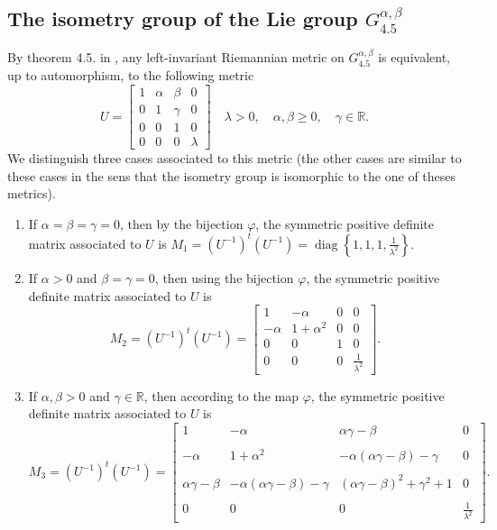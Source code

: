 \documentclass[12pt,a4paper,twoside]{article}
\theoremstyle{definition}
\begin{document}
\subsection{The isometry group of the Lie group $G_{4.5}^{\alpha, \beta}$}
By theorem 4.5. in \cite{aitbenhaddou2025classification}, any left-invariant Riemannian metric on $G_{4.5}^{\alpha, \beta}$ is equivalent, up to automorphism, to the following metric
$$U = \begin{bmatrix}
1 & \alpha & \beta & 0\\
0 & 1 & \gamma & 0\\
0 & 0 & 1 & 0\\
0 & 0 & 0 & \lambda
\end{bmatrix} \quad \lambda > 0, \quad \alpha, \beta \geq 0, \quad \gamma \in \mathbb{R}.$$
We distinguish three cases associated to this metric (the other cases are similar to these cases in the sens that the isometry group is isomorphic to the one of theses metrics).
\begin{enumerate}
\item If $\alpha = \beta = \gamma = 0$, then by the bijection $\varphi$, the symmetric positive definite matrix associated to $U$ is $M_1 = (U^{-1})^t(U^{-1}) = \operatorname{diag}\left\lbrace 1, 1, 1, \frac{1}{\lambda^2}\right\rbrace$.
\item If $\alpha > 0$ and $\beta = \gamma = 0$, then using the bijection $\varphi$, the symmetric positive definite matrix associated to $U$ is
$$M_2 = \left( U^{-1}\right)^t\left( U^{-1}\right) = \begin{bmatrix}
1 & -\alpha & 0 & 0\\
-\alpha & 1 + \alpha^2 & 0 & 0\\
0 & 0 & 1 & 0\\
0 & 0 & 0 & \frac{1}{\lambda^2}
\end{bmatrix}.$$
\item If $\alpha, \beta > 0$ and $\gamma \in \mathbb{R}$, then according to the map $\varphi$, the symmetric positive definite matrix associated to $U$ is
$$M_3 = (U^{-1})^t(U^{-1}) = \begin{bmatrix}
1 & -\alpha & \alpha\gamma - \beta & 0\\
\\
-\alpha & 1 + \alpha^2 & -\alpha(\alpha\gamma - \beta) - \gamma & 0\\
\\
\alpha\gamma - \beta & -\alpha(\alpha\gamma - \beta) - \gamma & (\alpha\gamma - \beta)^2 + \gamma^2 + 1 & 0\\
\\
0 & 0 & 0 & \frac{1}{\lambda^2}
\end{bmatrix}.$$
\end{enumerate}
\end{document}
